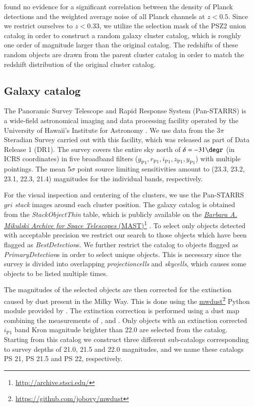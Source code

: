 \documentclass[iop, apjl, twocolappendix, numberedappendix]{emulateapj}
\newcommand\fnurl[2]{%
  \href{#2}{#1}\footnote{\url{#2}}%
}
\begin{document}
\citet{kosyra2015environment} found no evidence for a significant
correlation between the density of Planck detections and the
weighted average noise of all Planck channels at $z<0.5$. Since we
restrict ourselves to $z<0.33$, we utilize the selection mask of the
PSZ2 union catalog in order to construct a random galaxy cluster
catalog, which is roughly one order of magnitude larger than the
original catalog. The redshifts of these random objects are drawn
from the parent cluster catalog in order to match the redshift
distribution of the original cluster catalog.

\subsection{Galaxy catalog}
\label{sec:galaxies}
The Panoramic Survey Telescope and Rapid Response System
(Pan-STARRS) is a wide-field astronomical imaging and data
processing facility operated by the University of Hawaii's Institute
for Astronomy \citep{kaiser2002pan,kaiser2010pan}. We use data from
the 3$\pi$ Steradian Survey carried out with this facility, which
was released as part of Data Release 1 (DR1). The survey covers the
entire sky north of $\delta=-31\degr$ (in ICRS coordinates) in five
broadband filters ($g_{\mathrm{P1}}, r_{\mathrm{P1}},
i_{\mathrm{P1}}, z_{\mathrm{P1}}, y_{\mathrm{P1}}$) with multiple
pointings. The mean 5$\sigma$ point source limiting sensitivities
amount to (23.3, 23.2, 23.1, 22.3, 21.4) magnitudes for the
individual bands, respectively.

For the visual inspection and centering of the clusters, we use the
Pan-STARRS $gri$ \textit{stack} images around each cluster position.
The galaxy catalog is obtained from the  \textit{StackObjectThin}
table, which is publicly available on the \fnurl{\textit{Barbara A.
Mikulski Archive for Space Telescopes}
(MAST)}{http://archive.stsci.edu/}. To select only objects detected
with acceptable precision we restrict our search to those objects
which have been flagged as \textit{BestDetection}s. We further
restrict the catalog to objects flagged as
\textit{PrimaryDetection}s in order to select unique objects. This
is necessary since the survey is divided into overlapping
\textit{projectioncells} and \textit{skycells}, which causes some objects
to be listed multiple times.

The magnitudes of the selected objects are then corrected for the
extinction caused by dust present in the Milky Way. This is done
using the \fnurl{mwdust}{https://github.com/jobovy/mwdust} Python
module provided by \citet{bovy2016galactic}. The extinction
correction is performed using a dust map combining the measurements
of \citet{marshall2006modelling}, \citet{green2015three} and
\citet{drimmel2003three}. Only objects with an extinction corrected
$i_{\mathrm{P1}}$ band Kron magnitude brighter than 22.0 are
selected from the catalog. Starting from this catalog we construct
three different sub-catalogs corresponding to survey depths of 21.0,
21.5 and 22.0 magnitudes, and we name these catalogs PS 21, PS 21.5
and PS 22, respectively.
\end{document}
